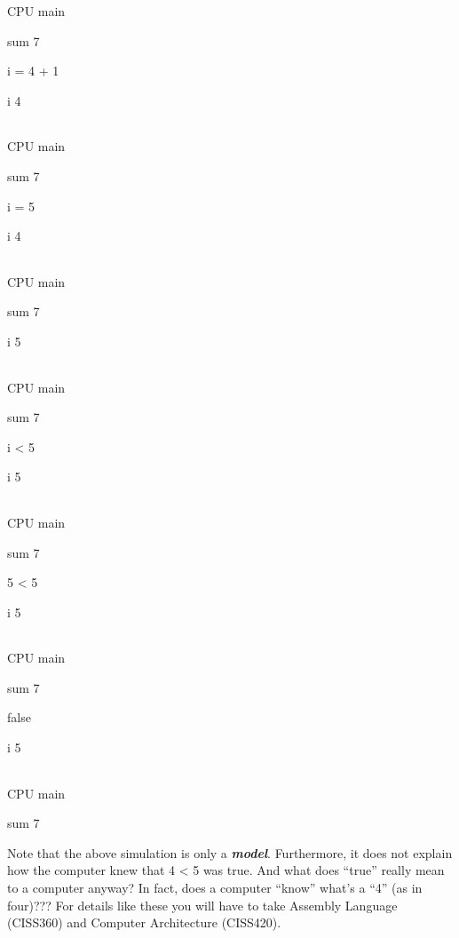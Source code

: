 \documentclass[
]{article}
\begin{document}
CPU main

sum 7

i = 4 + 1

i 4

\begin{longtable}[]{@{}@{}}
\toprule
\endhead
\bottomrule
\end{longtable}

CPU main

sum 7

i = 5

i 4

\begin{longtable}[]{@{}@{}}
\toprule
\endhead
\bottomrule
\end{longtable}

CPU main

sum 7

i 5

\begin{longtable}[]{@{}@{}}
\toprule
\endhead
\bottomrule
\end{longtable}

CPU main

sum 7

i \textless{} 5

i 5

\begin{longtable}[]{@{}@{}}
\toprule
\endhead
\bottomrule
\end{longtable}

CPU main

sum 7

5 \textless{} 5

i 5

\begin{longtable}[]{@{}@{}}
\toprule
\endhead
\bottomrule
\end{longtable}

CPU main

sum 7

false

i 5

\begin{longtable}[]{@{}@{}}
\toprule
\endhead
\bottomrule
\end{longtable}

CPU main

sum 7

Note that the above simulation is only a \emph{\textbf{model}}.
Furthermore, it does not explain how the computer knew that 4
\textless{} 5 was true. And what does ``true'' really mean to a computer
anyway? In fact, does a computer ``know'' what's a ``4'' (as in four)???
For details like these you will have to take Assembly Language (CISS360)
and Computer Architecture (CISS420).
\end{document}
